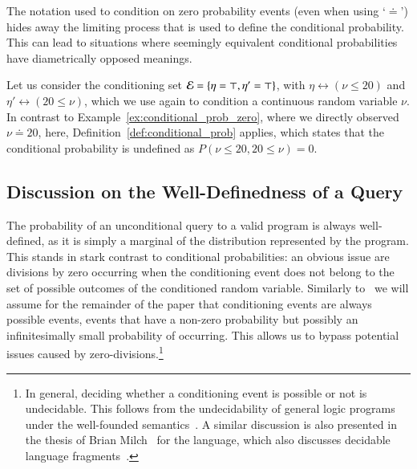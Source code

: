 The notation used to condition on zero probability events (even when using `$\doteq$') hides away the limiting process that is used to define the conditional probability. This can lead to situations where seemingly equivalent conditional probabilities have diametrically opposed meanings.

\begin{example} \label{ex:conditional_prob}
    Let us consider the conditioning set $\mathcal{E} = \{ \eta=\top, \eta'=\top \}$, with $\eta \leftrightarrow (\nu\leq 20)$ and $\eta' \leftrightarrow (20\leq \nu)$, which we use again to condition a continuous random variable $\nu$. In contrast to Example~\ref{ex:conditional_prob_zero}, where we directly observed $\nu\doteq 20$, here, Definition~\ref{def:conditional_prob} applies, which %
    states that the conditional probability is undefined as $P(\nu\leq 20, 20\leq \nu )=0$.
\end{example}







\subsection{Discussion on the Well-Definedness of a Query}

The probability of an unconditional query to a valid \dcproblogsty program is always well-defined, as it is simply a marginal of the distribution represented by the program.  
This stands in stark contrast to conditional probabilities: an obvious issue are  divisions by zero occurring when the conditioning event does not belong to the set of possible outcomes of the conditioned random variable. Similarly to~\citet{wu2018discrete} we will assume for the remainder of the paper that conditioning events are always possible events, \ie events that have a non-zero probability but possibly an infinitesimally small probability  of occurring. This allows us to bypass potential issues caused by zero-divisions.\footnote{In general, deciding whether a conditioning event is possible or not is undecidable. This follows from the undecidability of general logic programs under the well-founded semantics~\citep{cherchago2007decidability}. A similar discussion is also presented in the thesis of Brian Milch~\citep[Proposition 4.8]{milch2006probabilistic} for the \blogsty language, which also discusses decidable language fragments~\citep[Section 4.5]{milch2006probabilistic}.}  

